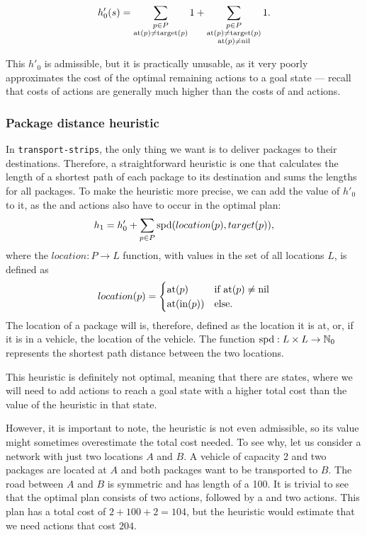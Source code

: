 $$h'_{0}(s) = \sum_{\substack{
p \in P\\ \textrm{at}(p) \neq \textrm{target}(p)}} 1
+ \sum_{\substack{
p \in P\\ \textrm{at}(p) \neq \textrm{target}(p)\\
\textrm{at}(p) \neq \textrm{nil}}} 1.$$

This $h'_0$ is admissible, but it is practically unusable, as it
very poorly approximates 
the cost of the optimal remaining actions to a goal state
--- recall that costs of \drive{} actions are generally much higher than the costs of \pickup{} and \drop{} actions.

\subsubsection{Package distance heuristic}\label{sfa1}

In \texttt{transport-strips}, the only thing we want is to deliver packages to their destinations. Therefore, a straightforward heuristic is one that calculates the length of a shortest
path of each package to its destination and sums the lengths for all packages.
To make the heuristic more precise, we can add the
value of $h'_0$ to it, as the \pickup{} and \drop{}
actions also have to occur in the optimal plan:
$$h_1 = h'_0 + \sum_{p \in P} \textrm{spd}(location(p), target(p)),$$
where the $location: P \to L$ function,
with values in the set of all locations $L$, is defined as
$$location(p) = \begin{cases} 
   \textrm{at}(p) & \text{if } \textrm{at}(p) \neq \textrm{nil}\\
   \textrm{at}(\textrm{in}(p)) & \text{else}.
  \end{cases}$$
The location of a package will is, therefore, defined
as the location it is at, or, if it is in a vehicle,
the location of the vehicle.
The function $\textrm{spd}: L \times L \to \mathbb{N}_0$ represents
the shortest path distance between the two locations.

This heuristic is definitely not optimal, meaning that there are states,
where we will need to add actions to reach a goal state with a higher total cost than the value of the heuristic in that state.

However, it is important to note, the heuristic
is not even admissible, so its value might sometimes overestimate the total cost needed.
To see why, let us consider a network with just two locations $A$ and $B$.
A vehicle of capacity 2 and two packages are located at $A$ and both packages want to be
transported to $B$. The road between $A$ and $B$ is symmetric and has length
of a 100. It is trivial to see that the optimal plan consists of two \pickup{} actions,
followed by a \drive{} and two \drop{} actions. This plan has a total cost of $2+100+2=104$,
but the heuristic would estimate that we need actions
that cost $204$.

